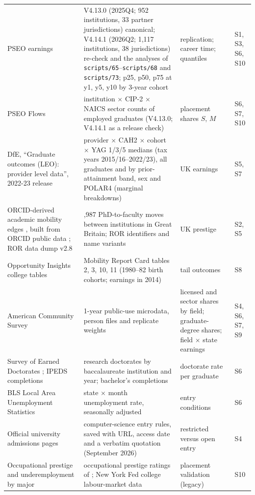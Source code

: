 \documentclass[11pt]{article}
\newcommand{\scr}[1]{\texttt{scripts/#1}}
\begin{document}
{\begin{longtable}{@{}>{\raggedright\arraybackslash}p{3.0cm}>{\raggedright\arraybackslash}p{5.4cm}>{\raggedright\arraybackslash}p{3.0cm}>{\raggedright\arraybackslash}p{3.6cm}@{}}
PSEO earnings \citep{pseo, pseo2026} & V4.13.0 (2025Q4; 952 institutions, 33 partner jurisdictions) canonical; V4.14.1 (2026Q2; 1,117 institutions, 38 jurisdictions) re-check and the analyses of \scr{65}--\scr{68} and \scr{73}; p25, p50, p75 at y1, y5, y10 by 3-year cohort & replication; career time; quantiles & S1, S3, S6, S10 \\
PSEO Flows \citep{pseo, pseo2026} & institution $\times$ CIP-2 $\times$ NAICS sector counts of employed graduates (V4.13.0; V4.14.1 as a release check) & placement shares $S$, $M$ & S6, S7, S10 \\
DfE, ``Graduate outcomes (LEO): provider level data'', 2022-23 release \citep{dfe_leo_provider} & provider $\times$ CAH2 $\times$ cohort $\times$ YAG 1/3/5 medians (tax years 2015/16--2022/23), all graduates and by prior-attainment band, sex and POLAR4 (marginal breakdowns) & UK earnings & S5, S7 \\
ORCID-derived academic mobility edges \citep{li2026orcid}, built from ORCID public data \citep{orcid}; ROR data dump v2.8 \citep{ror2026data} & 11,987 PhD-to-faculty moves between institutions in Great Britain; ROR identifiers and name variants & UK prestige & S2, S5 \\
Opportunity Insights college tables \citep{chetty2020income} & Mobility Report Card tables 2, 3, 10, 11 (1980--82 birth cohorts; earnings in 2014) & tail outcomes & S8 \\
American Community Survey \citep{census_acs2023_pums} & 2023 1-year public-use microdata, person files and replicate weights & licensed and sector shares by field; graduate-degree shares; field $\times$ state earnings & S4, S6, S7, S9 \\
Survey of Earned Doctorates \citep{ncses_sed_bacc}; IPEDS completions \citep{nces_ipeds} & research doctorates by baccalaureate institution and year; bachelor's completions & doctorate rate per graduate & S6 \\
BLS Local Area Unemployment Statistics \citep{fred_laus} & state $\times$ month unemployment rate, seasonally adjusted & entry conditions & S6 \\
Official university admissions pages & computer-science entry rules, saved with URL, access date and a verbatim quotation (September 2026) & restricted versus open entry & S4 \\
Occupational prestige and underemployment by major & occupational prestige ratings of \citet{hughes2024occupational} \citep{condon2022prestige}; New York Fed college labour-market data \citep{nyfed2026labor} & placement validation (legacy) & S10 \\
\end{longtable}
}
\end{document}
